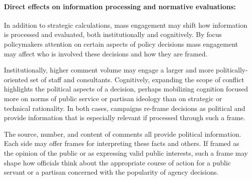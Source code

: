 \paragraph{Direct effects on information processing and normative evaluations:}
In addition to strategic calculations, mass engagement may shift how information is processed and evaluated, both institutionally and cognitively. %
By focus policymakers attention on certain aspects of policy decisions mass engagement may affect who is involved these decisions and how they are framed.

Institutionally, higher comment volume may engage a larger and more politically-oriented set of staff and consultants. Cognitively, expanding the scope of conflict highlights the political aspects of a decision, perhaps mobilizing cognition focused more on norms of public service or partisan ideology than on strategic or technical rationality. In both cases, campaigns re-frame decisions as political and provide information that is especially relevant if processed through such a frame.

The source, number, and content of comments all provide political information. Each side may offer frames for interpreting these facts and others. If 
framed as the opinion of the public or as expressing valid public interests, such a frame may shape how officials think about the appropriate course of action for a public servant or a partisan concerned with the popularity of agency decisions. 


